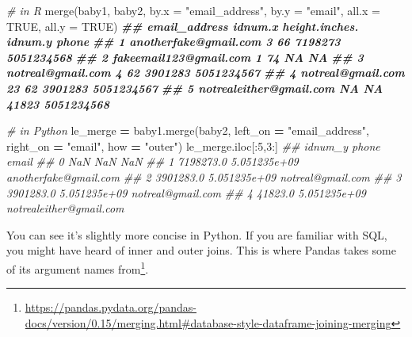 \documentclass[
  12pt,
  krantz2]{krantz}
\makeatletter
\newenvironment{Shaded}{\begin{snugshade}}{\end{snugshade}}
\newcommand{\AttributeTok}[1]{\textcolor[rgb]{0.61,0.61,0.61}{#1}}
\newcommand{\CommentTok}[1]{\textcolor[rgb]{0.37,0.37,0.37}{\textit{#1}}}
\newcommand{\ConstantTok}[1]{\textcolor[rgb]{0,0,0}{#1}}
\newcommand{\DecValTok}[1]{\textcolor[rgb]{0.06,0.06,0.06}{#1}}
\newcommand{\DocumentationTok}[1]{\textcolor[rgb]{0.37,0.37,0.37}{\textbf{\textit{#1}}}}
\newcommand{\FunctionTok}[1]{\textcolor[rgb]{0,0,0}{#1}}
\newcommand{\NormalTok}[1]{#1}
\newcommand{\OperatorTok}[1]{\textcolor[rgb]{0.43,0.43,0.43}{\textbf{#1}}}
\newcommand{\StringTok}[1]{\textcolor[rgb]{0.5,0.5,0.5}{#1}}
\renewcommand{\href}[2]{#2\footnote{\url{#1}}}
\newenvironment{kframe}{%
\medskip{}
\setlength{\fboxsep}{.8em}
 \def\at@end@of@kframe{}%
 \ifinner\ifhmode%
  \def\at@end@of@kframe{\end{minipage}}%
  \begin{minipage}{\columnwidth}%
 \fi\fi%
 \def\FrameCommand##1{\hskip\@totalleftmargin \hskip-\fboxsep
 \colorbox{shadecolor}{##1}\hskip-\fboxsep
     \hskip-\linewidth \hskip-\@totalleftmargin \hskip\columnwidth}%
 \MakeFramed {\advance\hsize-\width
   \@totalleftmargin\z@ \linewidth\hsize
   \@setminipage}}%
 {\par\unskip\endMakeFramed%
 \at@end@of@kframe}
\renewenvironment{Shaded}{\begin{kframe}}{\end{kframe}}
\makeatother
\begin{document}
\begin{Shaded}
\begin{Highlighting}[]
\CommentTok{\# in R}
\FunctionTok{merge}\NormalTok{(baby1, baby2, }
      \AttributeTok{by.x =} \StringTok{"email\_address"}\NormalTok{, }\AttributeTok{by.y =} \StringTok{"email"}\NormalTok{, }
      \AttributeTok{all.x =} \ConstantTok{TRUE}\NormalTok{, }\AttributeTok{all.y =} \ConstantTok{TRUE}\NormalTok{)}
\DocumentationTok{\#\#             email\_address idnum.x height.inches. idnum.y      phone}
\DocumentationTok{\#\# 1   anotherfake@gmail.com       3             66 7198273 5051234568}
\DocumentationTok{\#\# 2  fakeemail123@gmail.com       1             74      NA         NA}
\DocumentationTok{\#\# 3       notreal@gmail.com       4             62 3901283 5051234567}
\DocumentationTok{\#\# 4       notreal@gmail.com      23             62 3901283 5051234567}
\DocumentationTok{\#\# 5 notrealeither@gmail.com      NA             NA   41823 5051234568}
\end{Highlighting}
\end{Shaded}

\begin{Shaded}
\begin{Highlighting}[]
\CommentTok{\# in Python}
\NormalTok{le\_merge }\OperatorTok{=}\NormalTok{ baby1.merge(baby2, }
\NormalTok{                       left\_on }\OperatorTok{=} \StringTok{"email\_address"}\NormalTok{, right\_on }\OperatorTok{=} \StringTok{"email"}\NormalTok{, }
\NormalTok{                       how }\OperatorTok{=} \StringTok{"outer"}\NormalTok{)}
\NormalTok{le\_merge.iloc[:}\DecValTok{5}\NormalTok{,}\DecValTok{3}\NormalTok{:]}
\CommentTok{\#\#      idnum\_y         phone                    email}
\CommentTok{\#\# 0        NaN           NaN                      NaN}
\CommentTok{\#\# 1  7198273.0  5.051235e+09    anotherfake@gmail.com}
\CommentTok{\#\# 2  3901283.0  5.051235e+09        notreal@gmail.com}
\CommentTok{\#\# 3  3901283.0  5.051235e+09        notreal@gmail.com}
\CommentTok{\#\# 4    41823.0  5.051235e+09  notrealeither@gmail.com}
\end{Highlighting}
\end{Shaded}

You can see it's slightly more concise in Python. If you are familiar with SQL, you might have heard of inner and outer joins. This is where Pandas \href{https://pandas.pydata.org/pandas-docs/version/0.15/merging.html\#database-style-dataframe-joining-merging}{takes some of its argument names from}.
\end{document}
